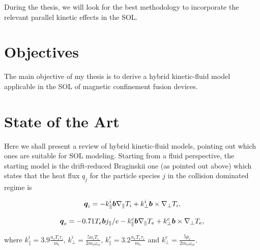 During the thesis, we will look for the best methodology to incorporate the relevant parallel kinetic effects in the SOL.


\section{Objectives \label{obj}}

The main objective of my thesis is to derive a hybrid kinetic-fluid model applicable in the SOL of magnetic confinement fusion devices.


\section{State of the Art \label{firstres}}

Here we shall present a review of hybrid kinetic-fluid models, pointing out which ones are suitable for SOL modeling. Starting from a fluid perspective, the starting model is the drift-reduced Braginskii one (as pointed out above) which states that the heat flux $q_j$ for the particle species $j$ in the collision dominated regime is \cite{Braginskii1965}

\begin{equation}
\boldsymbol{q}_i=-k_\parallel^i \boldsymbol{b} \nabla_\parallel T_i + k_\perp^i \boldsymbol{b} \times \nabla_\perp T_i,
\end{equation}

\begin{equation}
\boldsymbol{q}_e=-0.71 T_e \boldsymbol{b} j_\parallel/e -k_\parallel^e \boldsymbol{b} \nabla_\parallel T_e + k_\perp^e \boldsymbol{b} \times \nabla_\perp T_e,
\end{equation}

\noindent where $k_\parallel^i = 3.9 \frac{n_i T_i \tau_i}{m_i}$, $k_\perp^i=\frac{5 n_i T_i}{2 m_i \omega_{ci}}$, $k_\parallel^e=3.2\frac{n_e T_e \tau_e}{m_e}$ and $k_\perp^e=\frac{5 p_e}{2 m_e \omega_{ce}}$.%

